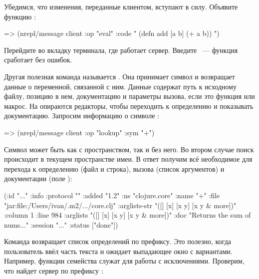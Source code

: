 Убедимся, что изменения, переданные клиентом, вступают в силу. Объявите функцию :

\begin{english}
  \begin{clojure}
=> (nrepl/message client {:op "eval" :code "
(defn add [a b]
  (+ a b))
"})
  \end{clojure}
\end{english}

Перейдите во вкладку терминала, где работает сервер. Введите ~--- функция сработает без ошибок.


Другая полезная команда называется . Она принимает символ и возвращает данные о переменной, связанной с ним. Данные содержат путь к исходному файлу, позицию в нем, документацию и параметры вызова, если это функция или макрос. На  опираются редакторы, чтобы переходить к определению и показывать документацию. Запросим информацию о символе \code{+}:

\begin{english}
  \begin{clojure}
=> (nrepl/message client {:op "lookup" :sym "+"})
  \end{clojure}
\end{english}

Символ может быть как с пространством, так и без него. Во втором случае поиск происходит в текущем пространстве имен. В ответ получим всё необходимое для перехода к определению (файл и строка), вызова (список аргументов) и документации (поле ):


\begin{english}
  \begin{clojure}
({:id "..."
  :info {:protocol ""
         :added "1.2"
         :ns "clojure.core"
         :name "+"
         :file "jar:file:/Users/ivan/.m2/.../core.clj"
         :arglists-str "([] [x] [x y] [x y & more])"
         :column 1
         :line 984
         :arglists "([] [x] [x y] [x y & more])"
         :doc "Returns the sum of nums..."}
  :session "..."
  :status ["done"]})
  \end{clojure}
\end{english}

Команда  возвращает список определений по префиксу. Это полезно, когда пользователь ввёл часть текста и ожидает выпадающее окно с вариантами. Например, функции семейства  служат для работы с исключениями. Проверим, что найдет сервер по префиксу :

